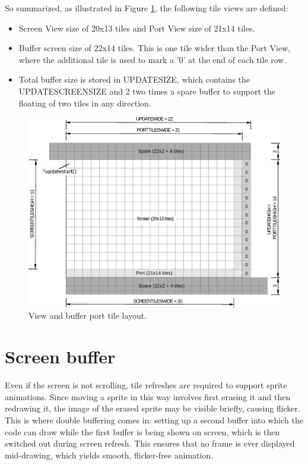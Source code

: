 \documentclass[book.tex]{subfiles}
\begin{document}
So summarized, as illustrated in Figure \ref{fig:screen_setup}, the following tile views are defined:
\begin{itemize}
\item Screen View size of 20x13 tiles and Port View size of 21x14 tiles.
\item Buffer screen size of 22x14 tiles. This is one tile wider than the Port View, where the additional tile is used to mark a '0' at the end of each tile row. 
\item Total buffer size is stored in UPDATESIZE, which contains the UPDATESCREENSIZE and 2 two times a spare buffer to support the floating of two tiles in any direction.
\end{itemize}
\par
 
\begin{figure}[H]
\centering
\includegraphics[width=\textwidth]{imgs/drawings/buffer_tile_layout.eps}
\caption{View and buffer port tile layout.}
\label{fig:screen_setup}
\end{figure}



\section{Screen buffer}
Even if the screen is not scrolling, tile refreshes are required to support sprite animations. Since moving a sprite in this way involves first erasing it and then redrawing it, the image of the erased sprite may be visible briefly, causing flicker. This is where double buffering comes in: setting up a second buffer into which the code can draw while the first buffer is being shown on screen, which is then switched out during screen refresh. This ensures that no frame is ever displayed mid-drawing, which yields smooth, flicker-free animation.\\
\end{document}
